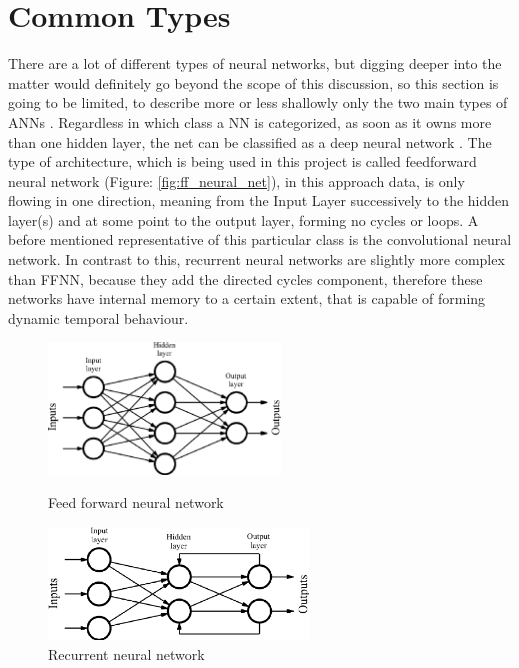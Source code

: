 \section{Common Types}
There are a lot of different types of neural networks, but digging deeper into the matter would definitely go beyond the scope of this discussion, so this section is going to be limited, to describe more or less shallowly only the two main types of ANNs \cite{nntutorial}. Regardless in which class a NN is categorized, as soon as it owns more than one hidden layer, the net can be classified as a deep neural network \cite{deep-learning-methods}. \newline
The type of architecture, which is being used in this project is called feedforward neural network (Figure: \ref{fig:ff_neural_net}), in this approach data, is only flowing in one direction, meaning from the Input Layer successively to the hidden layer(s) and at some point to the output layer, forming no cycles or loops. A before mentioned representative of this particular class is the convolutional neural network.\newline
In contrast to this, recurrent neural networks are slightly more complex than FFNN, because they add the directed cycles component, therefore these networks have internal memory to a certain extent, that is capable of forming dynamic temporal behaviour. 


\begin{figure}[H]
	
	\includegraphics[height=3.5cm]{images/feed_forward_neural_net.png}
	\caption{Feed forward neural network \cite{ffnn}}
	\label{fig:ff_neural_net}
	\endminipage
	\hfill
	\includegraphics[height=3cm]{images/recurrent_neural_net.png}
	\caption{Recurrent neural network \cite{rnn}}
	\label{fig:rec_neural_net}
	\endminipage
\end{figure}

